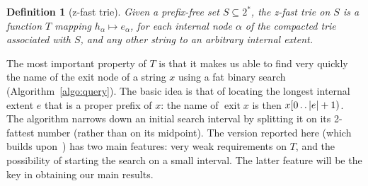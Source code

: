\documentclass[a4paper,11pt]{article}
\newtheorem{definition}[theorem]{Definition}
\newcommand{\?}{\mskip1.5mu}
\def\..{\,\mathpunct{\ldotp\ldotp}} %
\DeclareMathOperator{\exit}{exit}
\begin{document}
\begin{definition}[z-fast trie]
Given a prefix-free set $S\subseteq 2^*$, the \emph{z-fast trie on $S$} is 
a function $T$ mapping $h_\alpha \mapsto e_\alpha$, for each internal node
$\alpha$ of the compacted trie associated with $S$, and any other string to an
arbitrary internal extent.
\end{definition}

The most important property of $T$ is that it makes us able to find very quickly
the name of the exit node of a string $x$ using 
a fat binary search (Algorithm~\ref{algo:query}). The basic idea is that of locating the
longest internal extent $e$ that is a proper prefix of $x$:
the name of $\exit x$ is then $x[0\..|e|+1)$. The algorithm
narrows down an initial search interval by splitting it on its 2-fattest number (rather than on its midpoint).
The version reported here (which builds upon~\cite{BelazzouguiBoVi10}) has two main features:
very weak requirements on $T$, and the possibility of starting the search on a small interval. The
latter feature will be the key in obtaining our main results.

\end{document}
